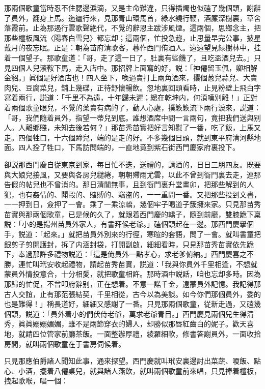 那兩個歌童當時忍不住腮邊淚滴，又是主命難違，只得插燭也似磕了幾個頭，謝辭了員外，翻身上馬。迤邐行來，見那青山環馬首，綠水繞行鞭，酒簾深樹裏，草舍落霞前。止為那遏行雲歌聲絶代，不覺的辭恩主跋涉風煙。這兩個，思鄉念主，把那些檀板風流〈陽春白雪兒〉都忘却；這兩個，忙投急趂，止思量早完公事，披星戴月的夜忘眠。正是：朝為苗府清歌客，暮作西門侑酒人。遠遠望見緑樹林中，挂着一個望子。那歌童道：「哥，走了這一日了，肚裏有些饑了，且吃盃酒兒去。」只見四個人兒滚鞍下馬，走入店中。那招牌上面寫的好，説：「神僊留玉佩，卿相解金貂。」眞個是好酒店也！四人坐下，喚過賣打上兩角酒來，攮個葱兒蒜兒、大賣肉兒、豆腐菜兒，舖上幾碟，正待舒懷暢飲。忽地裏回頭看時，止見粉壁上飛白字寫着兩行，説道：「千里不為遠，十年歸未遲；總在乾坤内，何湏嘆别離！」正對着兩個歌童眼兒，不覺的薬賣有病的了，動人心處，撲簌簌流下兩行淚來，説道：「哥，我們隨着員外，指望一蒂兒到底。誰想酒席中間一言兩句，竟把我們送與别人。人離鄉賤，未知去後若何？」那苗秀苗實把好言知慰了一番，吃了飯，上馬又走。四個牲口，十六個蹄兒，端的是走的好。不多幾個日頭，就到東平府清河縣地面。四人拴了牲口，下馬訪問端的，一直地竟到紫石街西門慶家府裏投下。

卻説那西門慶自従東京到家，每日忙不迭，送禮的，請酒的，日日三朋四友。既要與大娘兒接風，又要與各房兒繾綣，朝朝殢雨尤雲，以此不曾到衙門裏去走，連那告假的帖兒也不曾消的。那日清閒無事，且到衙門裏升堂畫卯，把那些解到的人犯，也有姦情的、鬦毆的、賭賻的、竊盗的，一一重問一番。又把那些投到文書，一一押到日，僉押了一會。乘了一乘涼轎，幾個牢子喝道子簇擁來家。只見那苗秀苗實與那兩個歌童，已是候的久了，就跟着西門慶的轎子，隨到前廳，雙膝跪下稟説：「小的是揚州苗員外家人，有書拜候老爺。」磕個頭起在一邊。那西門慶擧個手，説道：「起來。」就把苗員外別來的行徑，寒暄的套語，問了一會。就叫書童把銀剪子剪開護封，拆了内涵封袋，打開副啟，細細看時，只見那苗秀苗實依先跪下，奉過那許多禮物説道：「這是俺員外一點孝心，求老爹俯納。」西門慶喜之不勝，連忙叫玳安收起禮物，請起苗秀苗實，説道：「我與你員外千里相逢，不想就蒙員外情投意合，十分相愛，就把歌童相許。那時酒中説話，咱也忘却多時。因為那歸的忙促，不曾叩府辭别，正在想着。不意一諾千金，遠蒙員外記憶。我記得那古人交誼，止有那范張結契，千里相從，古今以為美談。如今你們那個員外，委的也是難得！」稱長道好，細細又感謝了一番。只見那兩個歌童，従新走過，又磕幾個頭，説道：「員外着小的們伏侍老爺，萬求老爺青目。」西門慶見兩個兒生得清秀，眞眞嫋嫋媚媚，雖不是兩節穿衣的婦人，却勝似那唇紅齒白的妮子。歡天喜地，就請四位管家前廳茶飯。一面整辦厚禮，綾羅細軟，修書答謝員外，一面收拾房間，就叫兩個歌童在于書房伺候着。

只見那應伯爵諸人聞知此事，通來探望。西門慶就叫玳安裏邊討出菜蔬、嗄飯、點心、小酒，擺着八僊桌兒，就與諸人燕飲，就叫兩個歌童前來唱，只見捧着檀板，拽起歌喉，唱一個：

